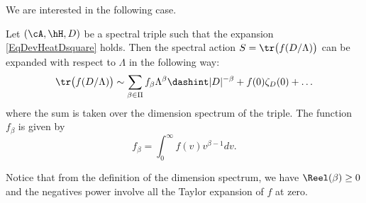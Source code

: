 We are interested in the following case.

\begin{theorem}			\label{ThoExpActSpect}
Let $(\cA,\hH,D)$ be a spectral triple such that the expansion \eqref{EqDevHeatDsquare} holds. Then the spectral action $S=\tr\big( f(D/\Lambda) \big)$ can be expanded with respect to $\Lambda$ in the following way:
\begin{equation}
\tr\big( f(D/\Lambda) \big)\sim\sum_{\beta\in\Pi}f_{\beta}\Lambda^{\beta}\dashint| D |^{-\beta}+f(0)\zeta_D(0)+\ldots
\end{equation}
where the sum is taken over the dimension spectrum of the triple. The function $f_{\beta}$ is given by
\begin{equation}			\label{Eqfbetaintdonne}
  f_{\beta}=\int_0^{\infty}f(v)v^{\beta-1}dv.
\end{equation}
\end{theorem}

Notice that from the definition of the dimension spectrum, we have $\Reel(\beta)\geq 0$ and the negatives power involve all the Taylor expansion of $f$ at zero.


